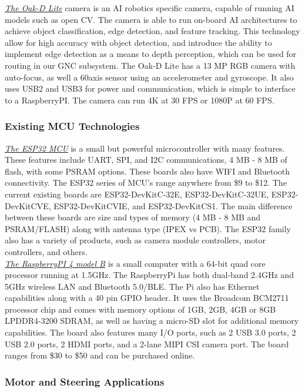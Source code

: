 \noindent \underline{\textit{The Oak-D Lite}} camera is an AI robotics specific camera, capable of running AI models such as open CV. The camera is able to run on-board AI architectures to achieve object classification, edge detection, and feature tracking. This technology allow for high accuracy with object detection, and introduce the ability to implement edge detection as a means to depth perception, which can be used for routing in our GNC subsystem. The Oak-D Lite has a 13 MP RGB camera with auto-focus, as well a 60axis sensor using an accelerometer and gyroscope. It also uses USB2 and USB3 for power and communication, which is simple to interface to a RaspberryPI. The camera can run 4K at 30 FPS or 1080P at 60 FPS.\\


\subsubsection{Existing MCU Technologies}
\noindent \underline{\textit{The ESP32 MCU}} is a small but powerful microcontroller with many features. These features include UART, SPI, and I2C communications, 4 MB - 8 MB of flash, with some PSRAM options. These boards also have WIFI and Bluetooth connectivity. The ESP32 series of MCU's range anywhere from \$9 to \$12. The current existing boards are ESP32-DevKitC-32E, ESP32-DevKitC-32UE, ESP32-DevKitCVE, ESP32-DevKitCVIE, and ESP32-DevKitCS1. The main difference between these boards are size and types of memory (4 MB - 8 MB and PSRAM/FLASH) along with antenna type (IPEX vs PCB). The ESP32 family also has a variety of products, such as camera module controllers, motor controllers, and others. \\

\noindent \underline{\textit{The RaspberryPI 4 model B}} is a small computer with a 64-bit quad core processor running at 1.5GHz. The RaspberryPi has both dual-band 2.4GHz and 5GHz wireless LAN and Bluetooth 5.0/BLE. The Pi also has Ethernet capabilities along with a 40 pin GPIO header. It uses the Broadcom BCM2711 processor chip and comes with memory options of 1GB, 2GB, 4GB or 8GB LPDDR4-3200 SDRAM, as well as having a micro-SD slot for additional memory capabilities. The board also features many I/O ports, such as 2 USB 3.0 ports, 2 USB 2.0 ports, 2 HDMI ports, and a 2-lane MIPI CSI camera port. The board ranges from \$30 to \$50 and can be purchased online.

\subsubsection{Motor and Steering Applications} 

